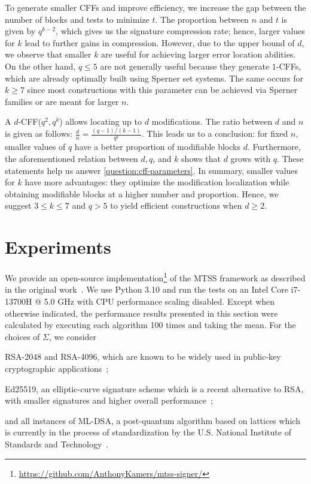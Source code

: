 \documentclass[12pt]{article}
\newcommand{\thais}[1]{{\color{blue}{#1}}}
\begin{document}
To generate smaller CFFs and improve efficiency, we increase the gap between the number of blocks and tests to minimize $t$. The proportion between $n$ and $t$ is given by $q^{k - 2}$, which gives us the signature compression rate; hence, larger values for $k$ lead to further gains in compression. However, due to the upper bound of $d$, we observe that smaller $k$ are useful for achieving larger error location abilities. On the other hand, $q \leq 5$ are not generally useful because they generate $1$-CFFs, which are already optimally built using Sperner set systems. The same occurs for $k \geq 7$ since most constructions with this parameter can be achieved via Sperner families or are meant for larger $n$.

A $d$-CFF($q^2, q^k$) allows locating up to $d$ modifications. The ratio between $d$ and $n$ is given as follows: $\frac{d}{n} = \frac{(q-1)/(k-1)}{q^k}$. This leads us to a conclusion: for fixed $n$, smaller values of $q$ have a better proportion of modifiable blocks $d$. Furthermore, the aforementioned relation between $d, q$, and $k$ shows that $d$ grows with $q$. These statements help us answer \ref{question:cff-parameters}. In summary, smaller values for $k$ have more advantages: they optimize the modification localization while obtaining modifiable blocks at a higher number and proportion. Hence, we suggest $3 \leq k \leq 7$ and $q > 5$ to yield efficient constructions when $d \geq 2$.



\section{Experiments}
\label{sec:experiments}

We provide an open-source implementation\footnote{\url{https://github.com/AnthonyKamers/mtss-signer/}} of the MTSS framework as described in the original work~\cite{mtss-idalino-2019}. We use Python 3.10 and run the tests on an Intel Core i7-13700H @ 5.0 GHz with CPU performance scaling disabled. Except when otherwise indicated, the performance results presented in this section were calculated by executing each algorithm 100 times and taking the mean. For the choices of $\Sigma$, we consider
\begin{enumerate*}[(i)]
  \item RSA-2048 and RSA-4096, which are known to be widely used in public-key cryptographic applications~\cite{rsa-most-used-cao-2008};
  \item Ed25519, an elliptic-curve signature scheme which is a recent alternative to RSA, with smaller signatures and higher overall performance~\cite{ed25519-bernstein-2012};
  \item and all instances of ML-DSA, a post-quantum algorithm based on lattices which is currently in the process of standardization by the U.S. National Institute of Standards and Technology~\cite{fips-204-dilithium-nist-2023}.
\end{enumerate*}
\end{document}
